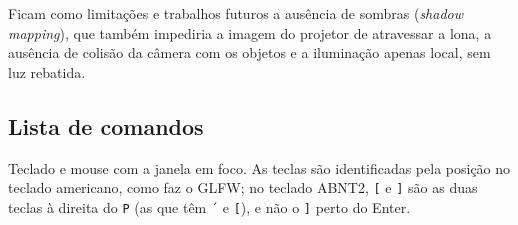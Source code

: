 \documentclass[
  12pt,          %
  oneside,       %
  a4paper,       %
  chapter=TITLE, %
  english,
  brazil,        %
]{abntex2}
\begin{document}
Ficam como limitações e trabalhos futuros a ausência de sombras (\emph{shadow mapping}), que também
impediria a imagem do projetor de atravessar a lona, a ausência de colisão da câmera com os objetos e a
iluminação apenas local, sem luz rebatida.

\postextual

\begin{apendicesenv}

\chapter{Lista de comandos}
\label{ap:comandos}

Teclado e mouse com a janela em foco. As teclas são identificadas pela posição no teclado americano, como faz
o GLFW; no teclado ABNT2, \texttt{[} e \texttt{]} são as duas teclas à direita do \texttt{P} (as que têm
\texttt{´} e \texttt{[}), e não o \texttt{]} perto do Enter.


\end{apendicesenv}
\end{document}
